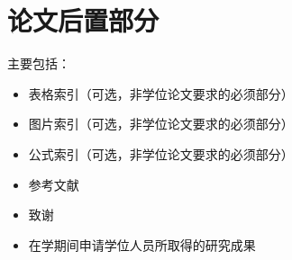 

\chapter{论文后置部分}
\label{cha:backmatter}

主要包括：
\begin{itemize}
\item 表格索引（可选，非学位论文要求的必须部分）
\item 图片索引（可选，非学位论文要求的必须部分）
\item 公式索引（可选，非学位论文要求的必须部分）
\item 参考文献
\item 致谢
\item 在学期间申请学位人员所取得的研究成果
\end{itemize}

